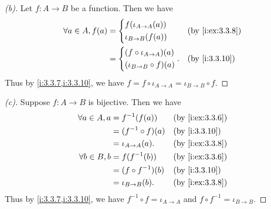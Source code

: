 \begin{proof}[(b)]
  Let \(f : A \to B\) be a function.
  Then we have
  \begin{align*}
    \forall a \in A, f(a) & = \begin{dcases}
                                f(\iota_{A \to A}(a)) \\
                                \iota_{B \to B}(f(a))
                              \end{dcases}        &  & \by{i:ex:3.3.8} \\
                          & = \begin{dcases}
                                (f \circ \iota_{A \to A})(a) \\
                                (\iota_{B \to B} \circ f)(a)
                              \end{dcases}. &  & \by{i:3.3.10}
  \end{align*}
  Thus by \cref{i:3.3.7,i:3.3.10}, we have \(f = f \circ \iota_{A \to A} = \iota_{B \to B} \circ f\).
\end{proof}

\begin{proof}[(c)]
  Suppose \(f : A \to B\) is bijective.
  Then we have
  \begin{align*}
    \forall a \in A, a & = f^{-1}(f(a))        &  & \by{i:ex:3.3.6} \\
                       & = (f^{-1} \circ f)(a) &  & \by{i:3.3.10}   \\
                       & = \iota_{A \to A}(a). &  & \by{i:ex:3.3.8} \\
    \forall b \in B, b & = f(f^{-1}(b))        &  & \by{i:ex:3.3.6} \\
                       & = (f \circ f^{-1})(b) &  & \by{i:3.3.10}   \\
                       & = \iota_{B \to B}(b). &  & \by{i:ex:3.3.8}
  \end{align*}
  Thus by \cref{i:3.3.7,i:3.3.10}, we have \(f^{-1} \circ f = \iota_{A \to A}\) and \(f \circ f^{-1} = \iota_{B \to B}\).
\end{proof}

